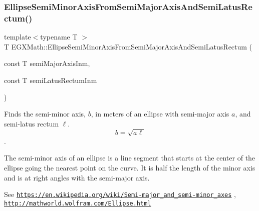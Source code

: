 \mbox{\label{group___e_g_x_math-_geometry-2_d-_ellipse-_semi_minor_axis_gaed84cd29b0768dd8eb2628b69e5c163f}} 
\subsubsection{\texorpdfstring{Ellipse\+Semi\+Minor\+Axis\+From\+Semi\+Major\+Axis\+And\+Semi\+Latus\+Rectum()}{EllipseSemiMinorAxisFromSemiMajorAxisAndSemiLatusRectum()}}
{\footnotesize\ttfamily template$<$typename T $>$ \\
T E\+G\+X\+Math\+::\+Ellipse\+Semi\+Minor\+Axis\+From\+Semi\+Major\+Axis\+And\+Semi\+Latus\+Rectum (\begin{DoxyParamCaption}\item[{const T}]{semi\+Major\+Axis\+Inm,  }\item[{const T}]{semi\+Latus\+Rectum\+Inm }\end{DoxyParamCaption})}



Finds the semi-\/minor axis, $b$, in meters of an ellipse with semi-\/major axis $a$, and semi-\/latus rectum $\ell$. \[ b= \sqrt{a\ell} \]. 

The semi-\/minor axis of an ellipse is a line segment that starts at the center of the ellipse going the nearest point on the curve. It is half the length of the minor axis and is at right angles with the semi-\/major axis.

See \href{https://en.wikipedia.org/wiki/Semi-major_and_semi-minor_axes}{\tt https\+://en.\+wikipedia.\+org/wiki/\+Semi-\/major\+\_\+and\+\_\+semi-\/minor\+\_\+axes} , \href{http://mathworld.wolfram.com/Ellipse.html}{\tt http\+://mathworld.\+wolfram.\+com/\+Ellipse.\+html}


